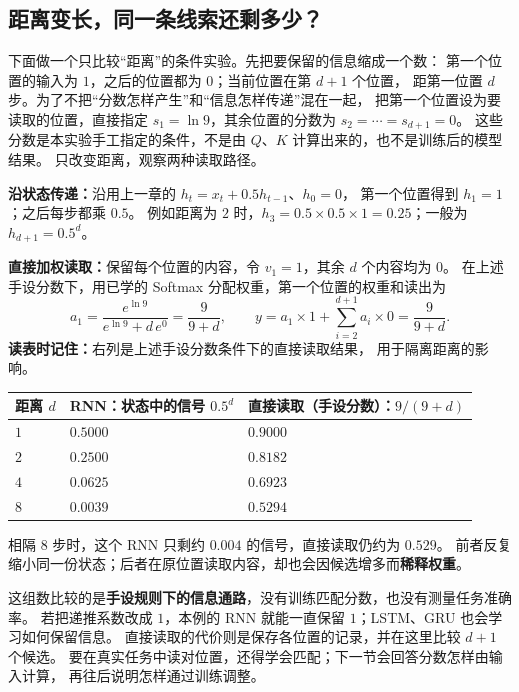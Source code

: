 \subsection{距离变长，同一条线索还剩多少？}
\label{experiment:distance-reading}

下面做一个只比较“距离”的条件实验。先把要保留的信息缩成一个数：
第一个位置的输入为 $1$，之后的位置都为 $0$；当前位置在第 $d+1$ 个位置，
距第一位置 $d$ 步。为了不把“分数怎样产生”和“信息怎样传递”混在一起，
把第一个位置设为要读取的位置，直接指定
$s_1=\ln9$，其余位置的分数为 $s_2=\cdots=s_{d+1}=0$。
这些分数是本实验手工指定的条件，不是由 $Q、K$ 计算出来的，也不是训练后的模型结果。
只改变距离，观察两种读取路径。

\textbf{沿状态传递：}沿用上一章的 $h_t=x_t+0.5h_{t-1}$、$h_0=0$，
第一个位置得到 $h_1=1$；之后每步都乘 $0.5$。
例如距离为 $2$ 时，$h_3=0.5\times0.5\times1=0.25$；一般为 $h_{d+1}=0.5^d$。

\textbf{直接加权读取：}保留每个位置的内容，令 $v_1=1$，其余 $d$ 个内容均为 $0$。
在上述手设分数下，用已学的 Softmax 分配权重，第一个位置的权重和读出为
\[
a_1=\frac{e^{\ln9}}{e^{\ln9}+d\,e^0}=\frac{9}{9+d},\qquad
y=a_1\times1+\sum_{i=2}^{d+1}a_i\times0=\frac{9}{9+d}.
\]
\textbf{读表时记住：}右列是上述手设分数条件下的直接读取结果，
用于隔离距离的影响。
\begin{center}\small
\renewcommand{\arraystretch}{1.2}
\begin{tabularx}{\linewidth}{@{}p{24mm}XX@{}}
\toprule
距离 $d$ & RNN：状态中的信号 $0.5^d$ & 直接读取（手设分数）：$9/(9+d)$\\\midrule
$1$ & $0.5000$ & $0.9000$\\
$2$ & $0.2500$ & $0.8182$\\
$4$ & $0.0625$ & $0.6923$\\
$8$ & $0.0039$ & $0.5294$\\
\bottomrule
\end{tabularx}
\end{center}
相隔 $8$ 步时，这个 RNN 只剩约 $0.004$ 的信号，直接读取仍约为 $0.529$。
前者反复缩小同一份状态；后者在原位置读取内容，却也会因候选增多而\textbf{稀释权重}。

这组数比较的是\textbf{手设规则下的信息通路}，没有训练匹配分数，也没有测量任务准确率。
若把递推系数改成 $1$，本例的 RNN 就能一直保留 $1$；LSTM、GRU 也会学习如何保留信息。
直接读取的代价则是保存各位置的记录，并在这里比较 $d+1$ 个候选。
要在真实任务中读对位置，还得学会匹配；下一节会回答分数怎样由输入计算，
再往后说明怎样通过训练调整。

